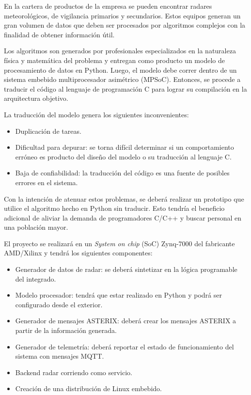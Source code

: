 \documentclass[
11pt, %
]{charter}
\begin{document}
En la cartera de productos de la empresa se pueden encontrar radares
meteorológicos, de vigilancia primarios y secundarios.
Estos equipos generan un gran volumen de datos que deben ser procesados por
algoritmos complejos con la finalidad de obtener información útil.

Los algoritmos son generados por profesionales especializados en la naturaleza
física y matemática del problema y entregan como producto un modelo de
procesamiento de datos en Python.
Luego, el modelo debe correr dentro de un sistema embebido multiprocesador
asimétrico (MPSoC).
Entonces, se procede a traducir el código al lenguaje de programación C para
lograr su compilación en la arquitectura objetivo.

La traducción del modelo genera los siguientes inconvenientes:

\begin{itemize}
  \item Duplicación de tareas.
  \item Dificultad para depurar: se torna difícil determinar si un
    comportamiento erróneo es producto del diseño del modelo o su traducción al
    lenguaje C.
  \item Baja de confiabilidad: la traducción del código es una fuente de
    posibles errores en el sistema.
\end{itemize}

Con la intención de atenuar estos problemas, se deberá realizar un prototipo que
utilice el algoritmo hecho en Python sin traducir. Esto tendría el beneficio
adicional de aliviar la demanda de programadores C/C++ y buscar personal en una
población mayor.

El proyecto se realizará en un \emph{System on chip} (SoC) Zynq-7000 del fabricante
AMD/Xilinx y tendrá los siguientes componentes:

\begin{itemize}
  \item Generador de datos de radar: se deberá sintetizar en la lógica
    programable del integrado.
  \item Modelo procesador: tendrá que estar realizado en Python y podrá ser
    configurado desde el exterior.
  \item Generador de mensajes ASTERIX: deberá crear los mensajes ASTERIX a
    partir de la información generada.
  \item Generador de telemetría: deberá reportar el estado de funcionamiento
    del sistema con mensajes MQTT.
  \item Backend radar corriendo como servicio.
  \item Creación de una distribución de Linux embebido.
\end{itemize}
\end{document}

